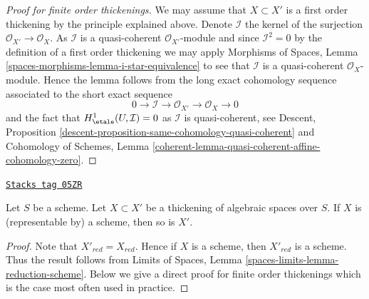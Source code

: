 \begin{proof}[Proof for finite order thickenings]
We may assume that $X \subset X'$ is a first order thickening by the
principle explained above. Denote $\mathcal{I}$ the kernel of the surjection
$\mathcal{O}_{X'} \to \mathcal{O}_X$. As $\mathcal{I}$ is a quasi-coherent
$\mathcal{O}_{X'}$-module and since $\mathcal{I}^2 = 0$ by the definition
of a first order thickening we may apply
Morphisms of Spaces, Lemma
\ref{spaces-morphisms-lemma-i-star-equivalence}
to see that $\mathcal{I}$ is a quasi-coherent $\mathcal{O}_X$-module.
Hence the lemma follows from the long exact cohomology sequence
associated to the short exact sequence
$$
0 \to \mathcal{I} \to \mathcal{O}_{X'} \to \mathcal{O}_X \to 0
$$
and the fact that $H^1_\etale(U, \mathcal{I}) = 0$ as
$\mathcal{I}$ is quasi-coherent, see
Descent, Proposition \ref{descent-proposition-same-cohomology-quasi-coherent}
and Cohomology of Schemes, Lemma
\ref{coherent-lemma-quasi-coherent-affine-cohomology-zero}.
\end{proof}

\begin{lemma}
\label{spaces-more-morphisms-lemma-thickening-scheme}
\href{https://stacks.math.columbia.edu/tag/05ZR}{\texttt{Stacks tag 05ZR}}

Let $S$ be a scheme. Let $X \subset X'$ be a thickening of algebraic spaces
over $S$. If $X$ is (representable by) a scheme, then so is $X'$.
\end{lemma}

\begin{proof}
Note that $X'_{red} = X_{red}$. Hence if $X$ is a scheme, then
$X'_{red}$ is a scheme. Thus the result follows from
Limits of Spaces, Lemma
\ref{spaces-limits-lemma-reduction-scheme}.
Below we give a direct proof for finite order thickenings which is
the case most often used in practice.
\end{proof}

